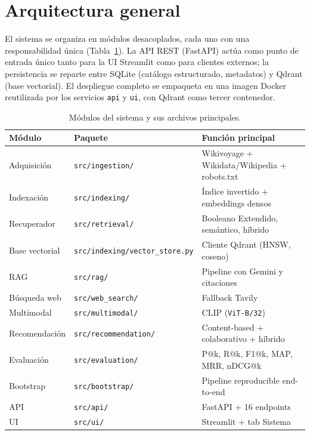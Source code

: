 \documentclass[runningheads,a4paper]{llncs}
\begin{document}
\section{Arquitectura general}

El sistema se organiza en m\'odulos desacoplados, cada uno con una responsabilidad \'unica (Tabla~\ref{tab:modulos}). La API REST (FastAPI) act\'ua como punto de entrada \'unico tanto para la UI Streamlit como para clientes externos; la persistencia se reparte entre SQLite (cat\'alogo estructurado, metadatos) y Qdrant (base vectorial). El despliegue completo se empaqueta en una imagen Docker reutilizada por los servicios \texttt{api} y \texttt{ui}, con Qdrant como tercer contenedor.

\begin{table}[t]
\centering
\caption{M\'odulos del sistema y sus archivos principales.}
\label{tab:modulos}
\small
\begin{tabular}{@{}lll@{}}
\toprule
\textbf{M\'odulo} & \textbf{Paquete} & \textbf{Funci\'on principal}\\
\midrule
Adquisici\'on & \texttt{src/ingestion/} & Wikivoyage + Wikidata/Wikipedia + robots.txt\\
Indexaci\'on & \texttt{src/indexing/} & \'Indice invertido + embeddings densos\\
Recuperador & \texttt{src/retrieval/} & Booleano Extendido, sem\'antico, h\'ibrido\\
Base vectorial & \texttt{src/indexing/vector\_store.py} & Cliente Qdrant (HNSW, coseno)\\
RAG & \texttt{src/rag/} & Pipeline con Gemini y citaciones\\
B\'usqueda web & \texttt{src/web\_search/} & Fallback Tavily\\
Multimodal & \texttt{src/multimodal/} & CLIP (\texttt{ViT-B/32})\\
Recomendaci\'on & \texttt{src/recommendation/} & Content-based + colaborativo + h\'ibrido\\
Evaluaci\'on & \texttt{src/evaluation/} & P@k, R@k, F1@k, MAP, MRR, nDCG@k\\
Bootstrap & \texttt{src/bootstrap/} & Pipeline reproducible end-to-end\\
API & \texttt{src/api/} & FastAPI + 16 endpoints\\
UI & \texttt{src/ui/} & Streamlit + tab Sistema\\
\bottomrule
\end{tabular}
\end{table}
\end{document}
